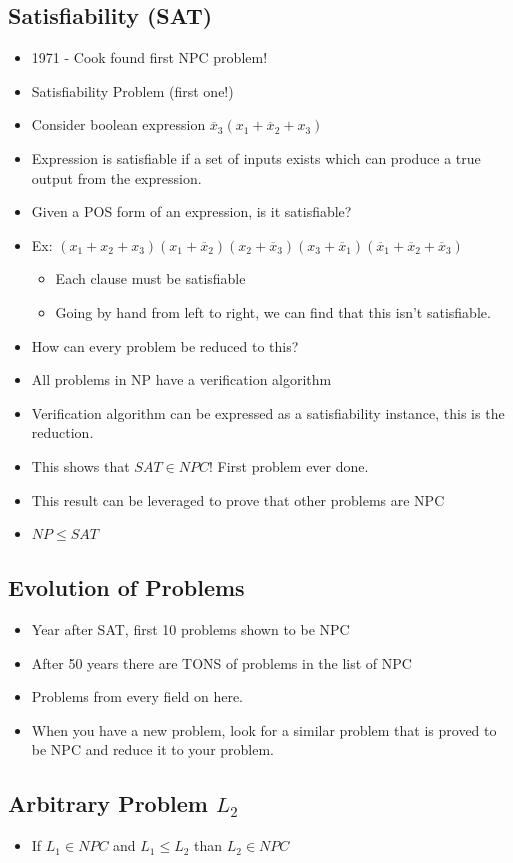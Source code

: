 \documentclass[12pt, letter]{article}
\begin{document}
\subsection*{Satisfiability (SAT)}
\begin{itemize}
	\item 1971 - Cook found first NPC problem!
	\item Satisfiability Problem (first one!)
	\item Consider boolean expression $\overline{x}_3(x_1+\overline{x}_2+x_3)$ 
	\item Expression is satisfiable if a set of inputs exists which can produce a true output from the expression.
	\item Given a POS form of an expression, is it satisfiable?
	\item Ex: $(x_1+x_2+x_3)(x_1+\overline{x}_2)(x_2+\overline{x}_3)(x_3+\overline{x}_1)(\overline{x}_1+\overline{x}_2+\overline{x}_3)$
	\begin{itemize}
		\item Each clause must be satisfiable
		\item Going by hand from left to right, we can find that this isn't satisfiable.
	\end{itemize}
	\item How can every problem be reduced to this?
	\item All problems in NP have a verification algorithm
	\item Verification algorithm can be expressed as a satisfiability instance, this is the reduction.
	\item This shows that $SAT \in NPC$! First problem ever done.
	\item This result can be leveraged to prove that other problems are NPC
	\item $NP \le SAT$
\end{itemize}

\subsection*{Evolution of Problems}
\begin{itemize}
	\item Year after SAT, first 10 problems shown to be NPC
	\item After 50 years there are TONS of problems in the list of NPC
	\item Problems from every field on here.
	\item When you have a new problem, look for a similar problem that is proved to be NPC and reduce it to your problem.
\end{itemize}

\subsection*{Arbitrary Problem $L_2$}
\begin{itemize}
	\item If $L_1 \in NPC$ and $L_1 \le L_2$ than $L_2 \in NPC$
\end{itemize}
\end{document}
